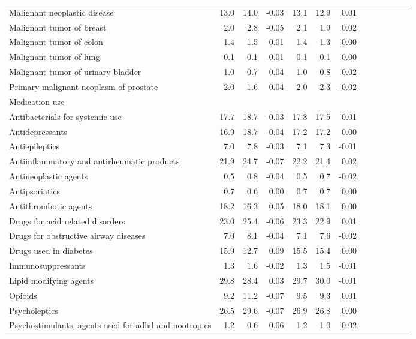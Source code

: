 \documentclass[11pt,]{article}
\begin{document}
\begin{longtable}{lrrrrrrrrrrrr}
      Malignant neoplastic disease & 13.0 & 14.0 & -0.03 & 13.1 & 12.9 &  0.01 \\ 
      Malignant tumor of breast &  2.0 &  2.8 & -0.05 &  2.1 &  1.9 &  0.02 \\ 
      Malignant tumor of colon &  1.4 &  1.5 & -0.01 &  1.4 &  1.3 &  0.00 \\ 
      Malignant tumor of lung &  0.1 &  0.1 & -0.01 &  0.1 &  0.1 &  0.00 \\ 
      Malignant tumor of urinary bladder &  1.0 &  0.7 &  0.04 &  1.0 &  0.8 &  0.02 \\ 
      Primary malignant neoplasm of prostate &  2.0 &  1.6 &  0.04 &  2.0 &  2.3 & -0.02 \\ 
  Medication use &    &    &     &    &    &     \\ 
      Antibacterials for systemic use & 17.7 & 18.7 & -0.03 & 17.8 & 17.5 &  0.01 \\ 
      Antidepressants & 16.9 & 18.7 & -0.04 & 17.2 & 17.2 &  0.00 \\ 
      Antiepileptics &  7.0 &  7.8 & -0.03 &  7.1 &  7.3 & -0.01 \\ 
      Antiinflammatory and antirheumatic products & 21.9 & 24.7 & -0.07 & 22.2 & 21.4 &  0.02 \\ 
      Antineoplastic agents &  0.5 &  0.8 & -0.04 &  0.5 &  0.7 & -0.02 \\ 
      Antipsoriatics &  0.7 &  0.6 &  0.00 &  0.7 &  0.7 &  0.00 \\ 
      Antithrombotic agents & 18.2 & 16.3 &  0.05 & 18.0 & 18.1 &  0.00 \\ 
      Drugs for acid related disorders & 23.0 & 25.4 & -0.06 & 23.3 & 22.9 &  0.01 \\ 
      Drugs for obstructive airway diseases &  7.0 &  8.1 & -0.04 &  7.1 &  7.6 & -0.02 \\ 
      Drugs used in diabetes & 15.9 & 12.7 &  0.09 & 15.5 & 15.4 &  0.00 \\ 
      Immunosuppressants &  1.3 &  1.6 & -0.02 &  1.3 &  1.5 & -0.01 \\ 
      Lipid modifying agents & 29.8 & 28.4 &  0.03 & 29.7 & 30.0 & -0.01 \\ 
      Opioids &  9.2 & 11.2 & -0.07 &  9.5 &  9.3 &  0.01 \\ 
      Psycholeptics & 26.5 & 29.6 & -0.07 & 26.9 & 26.8 &  0.00 \\ 
      Psychostimulants, agents used for adhd and nootropics &  1.2 &  0.6 &  0.06 &  1.2 &  1.0 &  0.02 \\ 
   \bottomrule\end{longtable}
\end{document}
